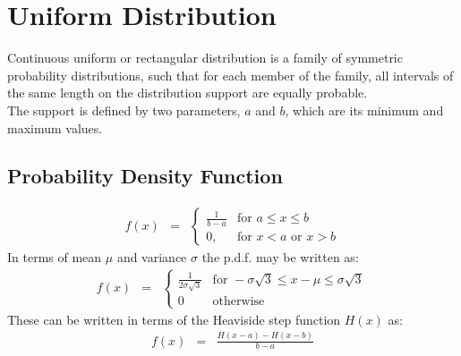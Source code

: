 \chapter{Uniform Distribution}
Continuous uniform or rectangular distribution is a family of symmetric probability distributions, such that for each member of the family, all intervals of the same length on the distribution support are equally probable.\\
The support is defined by two parameters, $a$ and $b$, which are its minimum and maximum values.

\section{Probability Density Function}
\begin{eqnarray}
	f(x) &=& \begin{cases}
	\frac{1}{b - a} & \text{for } a \leq x \leq b\\
	0, & \text{for } x < a \text{ or } x > b
	\end{cases}
\end{eqnarray}
In terms of mean $\mu$ and variance $\sigma$ the p.d.f. may be written as:
\begin{eqnarray}
	f(x) &=& \begin{cases}
		\frac{1}{2\sigma\sqrt{3}} & \text{for } -\sigma\sqrt{3} \leq x - \mu\leq \sigma\sqrt{3}\\
		0 & \text{otherwise}
	\end{cases}
\end{eqnarray}
These can be written in terms of the Heaviside step function $H(x)$ as:
\begin{eqnarray}
	f(x) &=& \frac{H(x - a) - H(x - b)}{b - a}
\end{eqnarray}

